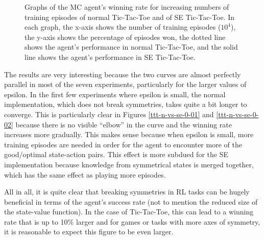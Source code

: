 \documentclass[11pt,a4paper]{report}
\begin{document}
\begin{figure}

    \caption{Graphs of the MC agent's winning rate for increasing numbers of training episodes of normal Tic-Tac-Toe and of SE Tic-Tac-Toe. In each graph, the x-axis shows the number of training episodes ($10^4$), the y-axis shows the percentage of episodes won, the dotted line shows the agent's performance in normal Tic-Tac-Toe, and the solid line shows the agent's performance in SE Tic-Tac-Toe.}
    \label{fig:tictactoe-normal-vs-symmetric-equality-performance}
\end{figure}

The results are very interesting because the two curves are almost perfectly parallel in most of the seven experiments, particularly for the larger values of epsilon. In the first few experiments where epsilon is small, the normal implementation, which does not break symmetries, takes quite a bit longer to converge. This is particularly clear in Figures \ref{ttt-n-vs-se-0-01} and \ref{ttt-n-vs-se-0-02} because there is no visible ``elbow'' in the curve and the winning rate increases more gradually. This makes sense because when epsilon is small, more training episodes are needed in order for the agent to encounter more of the good/optimal state-action pairs. This effect is more subdued for the SE implementation because knowledge from symmetrical states is merged together, which has the same effect as playing more episodes.

All in all, it is quite clear that breaking symmetries in RL tasks can be hugely beneficial in terms of the agent's success rate (not to mention the reduced size of the state-value function). In the case of Tic-Tac-Toe, this can lead to a winning rate that is up to 10\% larger and for games or tasks with more axes of symmetry, it is reasonable to expect this figure to be even larger.
\end{document}
